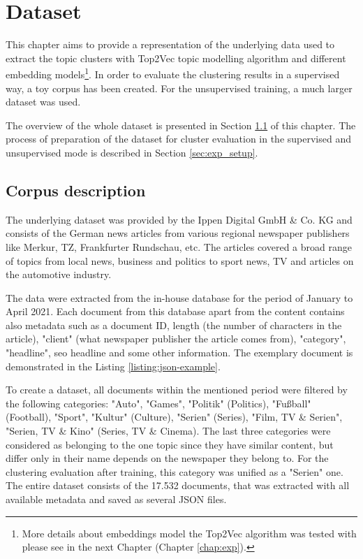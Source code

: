 \documentclass[fontsize=12pt,a4paper,twoside,openany]{scrbook}
\begin{document}
\chapter{Dataset}
\label{chap:dataset}
This chapter aims to provide a representation of the underlying data used to extract the topic clusters with Top2Vec topic modelling algorithm and different embedding models\footnote{More details about embeddings model the Top2Vec algorithm was tested with please see in the next Chapter (Chapter \ref{chap:exp}).}. In order to evaluate the clustering results in a supervised way, a toy corpus has been created. For the unsupervised training, a much larger dataset was used. 

The overview of the whole dataset is presented in Section \ref{sec:corp_exploration} of this chapter. The process of preparation of the dataset for cluster evaluation in the supervised and unsupervised mode is described in Section \ref{sec:exp_setup}.

\section{Corpus description}
\label{sec:corp_exploration}

The underlying dataset was provided by the Ippen Digital GmbH \& Co. KG and consists of the German news articles from various regional newspaper publishers like Merkur, TZ, Frankfurter Rundschau, etc. The articles covered a broad range of topics from local news, business and politics to sport news, TV and articles on the automotive industry.

The data were extracted from the in-house database for the period of January to April 2021. Each document from this database apart from the content contains also metadata such as a document ID, length (the number of characters in the article), "client" (what newspaper publisher the article comes from), "category", "headline", seo headline and some other information. The exemplary document is demonstrated in the Listing \ref{listing:json-example}.

To create a dataset, all documents within the mentioned period were filtered by the following categories: "Auto", "Games", "Politik" (Politics), "Fußball" (Football), "Sport", "Kultur" (Culture), "Serien" (Series), "Film, TV \& Serien", "Serien, TV \& Kino" (Series, TV \& Cinema). The last three categories were considered as belonging to the one topic since they have similar content, but differ only in their name depends on the newspaper they belong to. For the clustering evaluation after training, this category was unified as a "Serien" one. The entire dataset consists of the 17.532 documents, that was extracted with all available metadata and saved as several JSON files.
\end{document}
